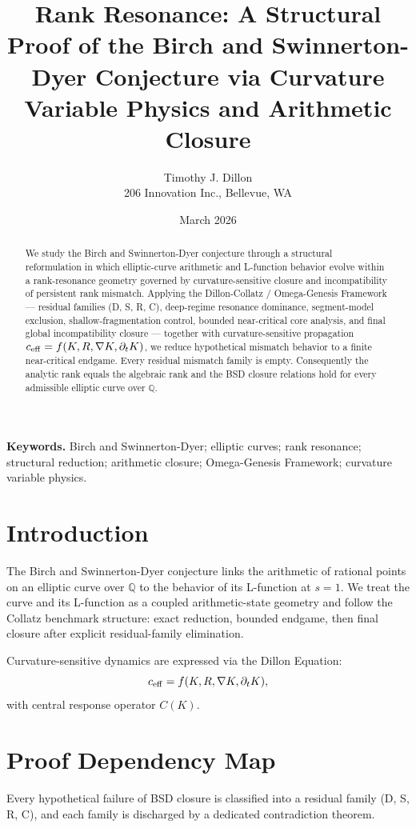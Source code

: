 \documentclass[11pt,a4paper]{article}
\title{Rank Resonance: A Structural Proof of the Birch and Swinnerton-Dyer Conjecture via Curvature Variable Physics and Arithmetic Closure}
\author{Timothy J. Dillon \\ 206 Innovation Inc., Bellevue, WA}
\date{March 2026}
\begin{document}
\maketitle

\begin{abstract}
We study the Birch and Swinnerton-Dyer conjecture through a structural reformulation in which elliptic-curve arithmetic and L-function behavior evolve within a rank-resonance geometry governed by curvature-sensitive closure and incompatibility of persistent rank mismatch. Applying the Dillon-Collatz / Omega-Genesis Framework --- residual families (D, S, R, C), deep-regime resonance dominance, segment-model exclusion, shallow-fragmentation control, bounded near-critical core analysis, and final global incompatibility closure --- together with curvature-sensitive propagation \(c_{\rm eff} = f(K, R, \nabla K, \partial_t K)\), we reduce hypothetical mismatch behavior to a finite near-critical endgame. Every residual mismatch family is empty. Consequently the analytic rank equals the algebraic rank and the BSD closure relations hold for every admissible elliptic curve over \(\mathbb{Q}\).
\end{abstract}

\textbf{Keywords.} Birch and Swinnerton-Dyer; elliptic curves; rank resonance; structural reduction; arithmetic closure; Omega-Genesis Framework; curvature variable physics.

\section{Introduction}
The Birch and Swinnerton-Dyer conjecture links the arithmetic of rational points on an elliptic curve over \(\mathbb{Q}\) to the behavior of its L-function at \(s=1\). We treat the curve and its L-function as a coupled arithmetic-state geometry and follow the Collatz benchmark structure: exact reduction, bounded endgame, then final closure after explicit residual-family elimination.

Curvature-sensitive dynamics are expressed via the Dillon Equation:
\[
c_{\rm eff} = f(K, R, \nabla K, \partial_t K),
\]
with central response operator \(C(K)\).

\section{Proof Dependency Map}
Every hypothetical failure of BSD closure is classified into a residual family (D, S, R, C), and each family is discharged by a dedicated contradiction theorem.
\end{document}
